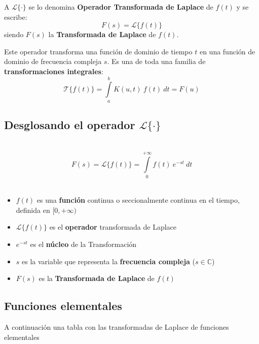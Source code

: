 \documentclass[12pt]{article}
\theoremstyle{definition}
\theoremstyle{theorem}
\theoremstyle{corolary}
\theoremstyle{method}
\begin{document}
A $\mathscr{L}\{\cdot\}$ se lo denomina \textbf{Operador Transformada de Laplace} de $f(t)$ y se escribe: $$F(s) = \mathscr{L}\{f(t)\}$$ siendo $F(s)$ la \textbf{Transformada de Laplace} de $f(t)$.

Este operador transforma una funci\'on de dominio de tiempo $t$ en una funci\'on de dominio de frecuencia compleja $s$. Es una de toda una familia de \textbf{transformaciones integrales}: $$\mathscr{T}\{f(t)\} = \int\limits_a^b K(u,t)\ f(t)\ dt = F(u)$$

\subsection*{Desglosando el operador $\mathscr{L}\{\cdot\}$}
\ \\
$$F(s) = \mathscr{L}\{f(t)\} = \int\limits_0^{+\infty}f(t)\ e^{-st}\ dt$$
\ \\
\begin{itemize}
	\item $f(t)$ es una \textbf{funci\'on} continua o seccionalmente continua en el tiempo, definida en $[0, +\infty)$
	\item $\mathscr{L}\{f(t)\}$ es el \textbf{operador} transformada de Laplace
	\item $e^{-st}$ es el \textbf{n\'ucleo} de la Transformaci\'on
	\item $s$ es la variable que representa la \textbf{frecuencia compleja} ($s\in \mathbb{C}$)
	\item $F(s)$ es la \textbf{Transformada de Laplace} de $f(t)$
\end{itemize}

\subsection*{Funciones elementales}
A continuaci\'on una tabla con las transformadas de Laplace de funciones elementales
\end{document}
